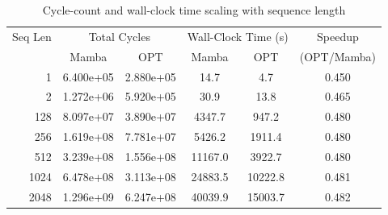 \begin{table}[h]\centering
    \caption{Cycle-count and wall-clock time scaling with sequence length}
    \label{tab:seq_scaling}
    \begin{tabular}{r cc cc c}\hline
        Seq Len & \multicolumn{2}{c}{Total Cycles} & \multicolumn{2}{c}{Wall-Clock Time (s)} & Speedup \\
            & Mamba & OPT & Mamba & OPT & (OPT/Mamba) \\\hline
        1 & 6.400e+05 & 2.880e+05 & 14.7 & 4.7 & 0.450 \\
        2 & 1.272e+06 & 5.920e+05 & 30.9 & 13.8 & 0.465 \\
      128 & 8.097e+07 & 3.890e+07 & 4347.7 & 947.2 & 0.480 \\
      256 & 1.619e+08 & 7.781e+07 & 5426.2 & 1911.4 & 0.480 \\
      512 & 3.239e+08 & 1.556e+08 & 11167.0 & 3922.7 & 0.480 \\
     1024 & 6.478e+08 & 3.113e+08 & 24883.5 & 10222.8 & 0.481 \\
     2048 & 1.296e+09 & 6.247e+08 & 40039.9 & 15003.7 & 0.482 \\
\hline\end{tabular}\end{table}